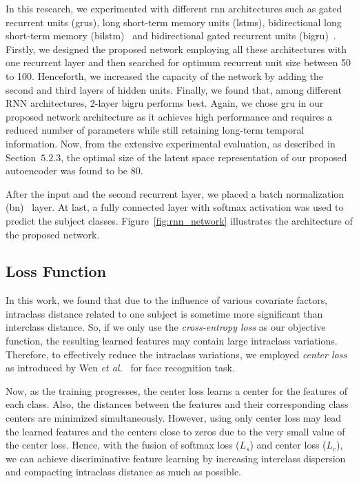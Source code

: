 In this research, we experimented with different \gls{rnn} architectures such as gated recurrent units (\gls{gru}s),  long short-term memory units (\gls{lstm}s), bidirectional long short-term memory (\gls{bilstm})~\cite{Graves_05} and bidirectional gated recurrent units (\gls{bigru})~\cite{Schuster_97}. Firstly, we designed the proposed network employing all these architectures with one recurrent layer and then searched for optimum recurrent unit size between 50 to 100. Henceforth, we increased the capacity of the network by adding the second and third layers of hidden units. Finally, we found that, among different RNN architectures, 2-layer \gls{bigru} performs best. Again, we chose \gls{gru} in our proposed network architecture as it achieves high performance and requires a reduced number of parameters while still retaining long-term temporal information. Now, from the extensive experimental evaluation, as described in Section~$5.2.3$, the optimal size of the latent space representation of our proposed autoencoder was found to be 80.

After the input and the second recurrent layer, we placed a batch normalization (\gls{bn})~\cite{Ioffe_15} layer. At last, a fully connected layer with softmax activation was used to predict the subject classes. Figure~\ref{fig:rnn_network} illustrates the architecture of the proposed network. 


\subsection{Loss Function}
In this work, we found that due to the influence of various covariate factors, intraclass distance related to one subject is sometime more significant than interclass distance. So, if we only use the \textit{cross-entropy loss} as our objective function, the resulting learned features may contain large intraclass variations. Therefore, to effectively reduce the intraclass variations, we employed \textit{center loss} as introduced by Wen \textit{et al.}~\cite{Wen_16} for face recognition task. 

Now, as the training progresses, the center loss learns a center for the features of each class. Also, the distances between the features and their corresponding class centers are minimized simultaneously. However, using only center loss may lead the learned features and the centers close to zeros due to the very small value of the center loss. Hence, with the fusion of softmax loss ($L_s$) and center loss ($L_c$), we can achieve discriminative feature learning by increasing interclass dispersion and compacting intraclass distance as much as possible.


